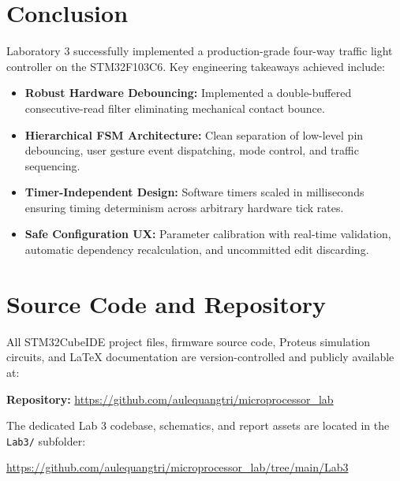 \documentclass{hcmut-report}
\begin{document}
\section{Conclusion}
Laboratory 3 successfully implemented a production-grade four-way traffic light controller on the STM32F103C6. Key engineering takeaways achieved include:
\begin{itemize}
    \item \textbf{Robust Hardware Debouncing:} Implemented a double-buffered consecutive-read filter eliminating mechanical contact bounce.
    \item \textbf{Hierarchical FSM Architecture:} Clean separation of low-level pin debouncing, user gesture event dispatching, mode control, and traffic sequencing.
    \item \textbf{Timer-Independent Design:} Software timers scaled in milliseconds ensuring timing determinism across arbitrary hardware tick rates.
    \item \textbf{Safe Configuration UX:} Parameter calibration with real-time validation, automatic dependency recalculation, and uncommitted edit discarding.
\end{itemize}

\section{Source Code and Repository}
All STM32CubeIDE project files, firmware source code, Proteus simulation circuits, and \LaTeX{} documentation are version-controlled and publicly available at:
\begin{center}
    \textbf{Repository: } \url{https://github.com/aulequangtri/microprocessor_lab}
\end{center}
The dedicated Lab 3 codebase, schematics, and report assets are located in the \texttt{Lab3/} subfolder:
\begin{center}
    \url{https://github.com/aulequangtri/microprocessor_lab/tree/main/Lab3}
\end{center}
\end{document}
